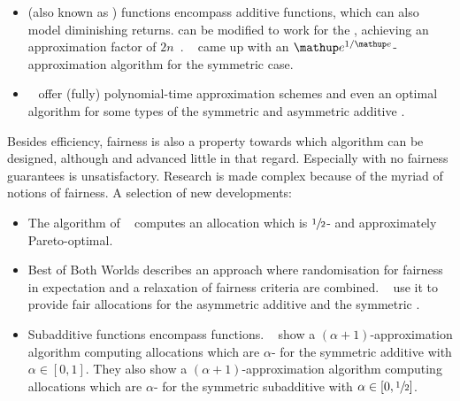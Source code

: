 \begin{itemize}
	\item
	\CASC{} (also known as \SPLC) functions encompass additive functions, which can also model diminishing returns.
	\SMatch{} can be modified to work for the \CASC{} \NSW{}, achieving an approximation factor of \(2n\)~\cite[Theorem 2.2]{APNSWuSVþUM}.
	~\cite{fair_division_of_indiv_goods_for_a_class_of_concave_valuations} came up with an \(\euler^{1/\euler}\)-approximation algorithm for the symmetric case.

	\item
	~\cite{tractable_fragments_of_the_max_nsw_problem} offer (fully) polynomial-time approximation schemes and even an optimal algorithm for some types of the symmetric and asymmetric additive \NSW.
\end{itemize}

\smallskip\noindent
Besides efficiency, fairness is also a property towards which algorithm can be designed, although \SMatch{} and \RepReMatch{} advanced little in that regard.
Especially \RepReMatch{} with no fairness guarantees is unsatisfactory.
Research is made complex because of the myriad of notions of fairness.
A selection of new developments:
\begin{itemize}
	\item
	The algorithm of \citeauthor{fair_division_of_indiv_goods_for_a_class_of_concave_valuations}~\cite{fair_division_of_indiv_goods_for_a_class_of_concave_valuations} computes an allocation which is \(\sfrac{1}{2}\)-\EFone{} and approximately Pareto-optimal.

	\item
	Best of Both Worlds describes an approach where randomisation for fairness in expectation and a relaxation of fairness criteria are combined.
	~\cite{bobw_agents_with_entitlements} use it to provide fair allocations for the asymmetric additive \NSW{} and the symmetric \XOS{} \NSW.

	\item
	Subadditive functions encompass \XOS{} functions.
	~\cite{on_optimal_tradeoffs_between_efx_and_nsw} show a \((\alpha + 1)\)-approximation algorithm computing allocations which are \(\alpha\)-\EFX{} for the symmetric additive \NSW{} with \(\alpha \in [0, 1]\).
	They also show a \((\alpha+1)\)-approximation algorithm computing allocations which are \(\alpha\)-\EFX{} for the symmetric subadditive \NSW{} with \(\alpha \in [0, \sfrac{1}{2}]\).
\end{itemize}

